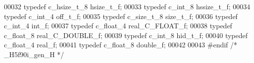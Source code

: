 \begin{DoxyCode}
00032 \textcolor{keyword}{typedef} c\_hsize\_t\_8 hsize\_t\_f;
00033 \textcolor{keyword}{typedef} c\_int\_8 hssize\_t\_f;
00034 \textcolor{keyword}{typedef} c\_int\_4 off\_t\_f;
00035 \textcolor{keyword}{typedef} c\_size\_t\_8 size\_t\_f;
00036 \textcolor{keyword}{typedef} c\_int\_4 int\_f;
00037 \textcolor{keyword}{typedef} c\_float\_4 real\_C\_FLOAT\_f;
00038 \textcolor{keyword}{typedef} c\_float\_8 real\_C\_DOUBLE\_f;
00039 \textcolor{keyword}{typedef} c\_int\_8 hid\_t\_f;
00040 \textcolor{keyword}{typedef} c\_float\_4 real\_f;
00041 \textcolor{keyword}{typedef} c\_float\_8 double\_f;
00042 
00043 \textcolor{preprocessor}{#endif }\textcolor{comment}{/* \_H5f90i\_gen\_H */}\textcolor{preprocessor}{}
\end{DoxyCode}
